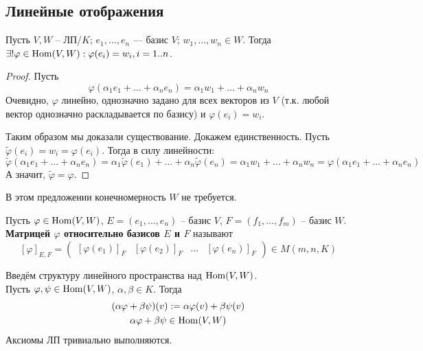 \subsection{Линейные отображения}

\begin{theorem}
    Пусть $V, W$ -- ЛП/$K$; $e_1, \dots, e_n$ --- базис $V$;
    $w_1, \dots, w_n \in W$. Тогда 
    $\exists! \varphi \in \operatorname{Hom}(V, W) : \varphi(e_i) = w_i, i = 1..n$.
\end{theorem}
\begin{proof}
    Пусть $$\varphi(\alpha_1 e_1 + \dots + \alpha_n e_n) =
    \alpha_1 w_1 + \dots + \alpha_n w_n $$
    Очевидно, $\varphi$ линейно, однозначно задано для всех векторов 
    из $V$ (т.к. любой вектор однозначно раскладывается по базису)
    и $\varphi(e_i) = w_i$.

    Таким образом мы доказали существование. Докажем единственность.
    Пусть $ \widetilde{\varphi}(e_i) = w_i = \varphi(e_i)$. Тогда
    в силу линейности:
    $$\widetilde{\varphi}(\alpha_1 e_1 + \dots + \alpha_n e_n) = 
    \alpha_1 \widetilde{\varphi}(e_1) + \dots + \alpha_n \widetilde{\varphi}(e_n) =
    \alpha_1 w_1 + \dots + \alpha_n w_n = \varphi(\alpha_1 e_1 + \dots + \alpha_n e_n)$$
    А значит, $\widetilde{\varphi} = \varphi$.
\end{proof}
\notice В этом предложении конечномерность $W$ не требуется.

\begin{conj}
    Пусть $\varphi \in \operatorname{Hom}(V, W)$, $E = (e_1, \dots, e_n)$ -- базис $V$,
    $F = (f_1, \dots, f_m)$ -- базис $W$. \textbf{Матрицей $\varphi$ 
    относительно базисов $E$ и $F$} называют
    $$ [ \varphi ]_{E, F} = \begin{pmatrix}
        [ \varphi(e_1)]_F & [ \varphi(e_2)]_F & \dots & [ \varphi(e_n) ]_F
    \end{pmatrix} \in M(m, n, K)
    $$
\end{conj}

\begin{conj}
    Введём структуру линейного пространства над $\operatorname{Hom}(V, W)$. \\
    Пусть $\varphi, \psi \in \operatorname{Hom}(V, W)$, $\alpha, \beta \in K$.
    Тогда 
    \begin{gather*}
        (\alpha \varphi + \beta \psi)(v) := \alpha \varphi(v) +
        \beta \psi(v) \\
        \alpha \varphi + \beta \psi \in \operatorname{Hom}(V, W)
    \end{gather*}  
    Аксиомы ЛП тривиально выполняются.
\end{conj}

